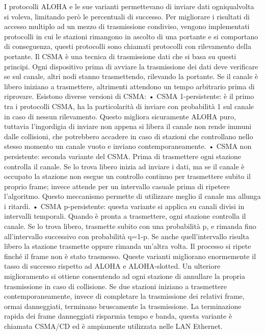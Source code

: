 I protocolli ALOHA e le sue varianti permettevano di inviare dati ogniqualvolta si voleva, limitando però le percentuali di successo. Per migliorare i risultati di accesso multiplo ad un mezzo di trasmissione condiviso, vengono implementati protocolli in cui le stazioni rimangono in ascolto di una portante e si comportano di conseguenza, questi protocolli sono chiamati protocolli con rilevamento della portante.
Il CSMA è una tecnica di trasmissione dati che si basa su questi principi. Ogni dispositivo prima di avviare la trasmissione dei dati deve verificare se sul canale, altri nodi stanno trasmettendo, rilevando la portante. Se il canale è libero iniziano a trasmettere, altrimenti attendono un tempo arbitrario prima di riprovare.
Esistono diverse versioni di CSMA:
•	CSMA 1-persistente: è il primo tra i protocolli CSMA, ha la particolarità di inviare con probabilità 1 sul canale in caso di nessun rilevamento. Questo migliora sicuramente ALOHA puro, tuttavia l’ingordigia di inviare non appena si libera il canale non rende immuni dalle collisioni, che potrebbero accadere in caso di stazioni che controllano nello stesso momento un canale vuoto e inviano contemporaneamente.
•	CSMA non persistente: seconda variante del CSMA. Prima di trasmettere ogni stazione controlla il canale. Se lo trova libero inizia ad inviare i dati, ma se il canale è occupato la stazione non esegue un controllo continuo per trasmettere subito il proprio frame; invece attende per un intervallo casuale prima di ripetere l’algoritmo. Questo meccanismo permette di utilizzare meglio il canale ma allunga i ritardi.
•	CSMA p-persistente: questa variante si applica su canali divisi in intervalli temporali. Quando è pronta a trasmettere, ogni stazione controlla il canale. Se lo trova libero, trasmette subito con una probabilità p, e rimanda fino all’intervallo successivo con probabilità q=1-p. Se anche quell’intervallo risulta libero la stazione trasmette oppure rimanda un’altra volta. Il processo si ripete finché il frame non è stato trasmesso.
Queste varianti migliorano enormemente il tasso di successo rispetto ad ALOHA e ALOHA-slotted.
Un ulteriore miglioramento si ottiene consentendo ad ogni stazione di annullare la propria trasmissione in caso di collisione. Se due stazioni iniziano a trasmettere contemporaneamente, invece di completare la trasmissione dei relativi frame, ormai danneggiati, terminano bruscamente la trasmissione. La terminazione rapida dei frame danneggiati risparmia tempo e banda, questa variante è chiamata CSMA/CD ed è ampiamente utilizzata nelle LAN Ethernet.

